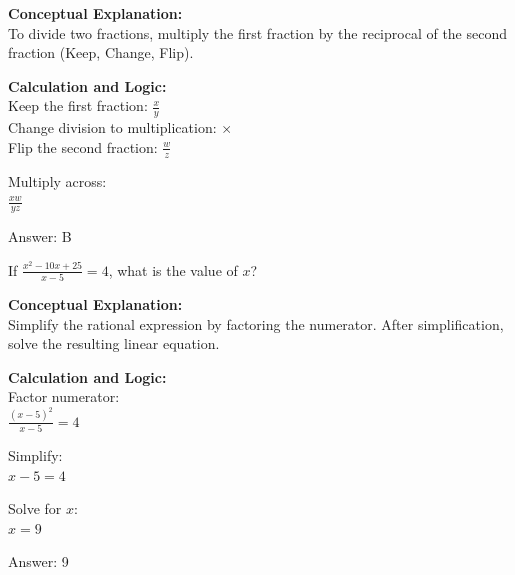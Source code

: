 \documentclass[11pt,paper=a4,answers]{exam}
\begin{document}
\begin{questions}
\begin{solution}
\textbf{Conceptual Explanation:} \\
To divide two fractions, multiply the first fraction by the reciprocal of the second fraction (Keep, Change, Flip).

\vspace{20pt}

\textbf{Calculation and Logic:} \\
Keep the first fraction: $\frac{x}{y}$ \\
Change division to multiplication: $\times$ \\
Flip the second fraction: $\frac{w}{z}$

\vspace{10pt}

Multiply across: \\
$\frac{xw}{yz}$

\vspace{25pt}

Answer: \colorbox{yellow!100}{B}
\end{solution}

\vspace{40pt}

\question
If $\frac{x^2 - 10x + 25}{x - 5} = 4$, what is the value of $x$?

\begin{solution}
\textbf{Conceptual Explanation:} \\
Simplify the rational expression by factoring the numerator. After simplification, solve the resulting linear equation.

\vspace{20pt}

\textbf{Calculation and Logic:} \\
Factor numerator: \\
$\frac{(x-5)^2}{x-5} = 4$

\vspace{10pt}

Simplify: \\
$x - 5 = 4$

\vspace{10pt}

Solve for $x$: \\
$x = 9$

\vspace{25pt}

Answer: \colorbox{yellow!100}{9}
\end{solution}


\end{questions}
\end{document}
